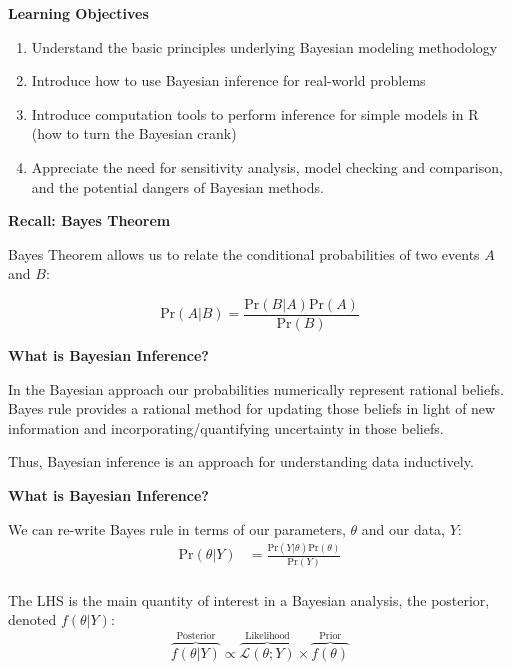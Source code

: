 \documentclass[12pt,xcolor=svgnames]{beamer}
\newcommand{\bl}{\color{blue}}
\newcommand{\theme}{\color{FireBrick}}
\newcommand{\sk}{\vspace{.4cm}}
\newcommand{\chap}[1]{{\theme \Large \bf #1} \sk}
\newcommand{\pr}{\text{Pr}}
\begin{document}


\begin{frame}
\chap{Learning Objectives}

\begin{enumerate}
\item Understand the basic principles underlying Bayesian modeling methodology
\item  Introduce how to use Bayesian inference for real-world problems
\item Introduce computation tools to perform inference for simple models in R (how to turn the Bayesian crank)
\item Appreciate the need for sensitivity analysis, model checking and comparison, and the potential dangers of Bayesian methods.
\end{enumerate}

\end{frame}


\begin{frame}
\chap{Recall: Bayes Theorem} 

Bayes Theorem allows us to relate the conditional probabilities of two events $A$ and $B$:

\begin{equation*}
\pr(A|B) = \frac{\pr(B|A)\pr(A)}{\pr(B)}
\end{equation*}

\end{frame}

\begin{frame}
\chap{What is Bayesian Inference?} 

In the Bayesian approach our probabilities numerically represent rational beliefs. Bayes rule provides a rational method for updating those beliefs in light of new information and incorporating/quantifying uncertainty in those beliefs.\\

\sk

Thus, Bayesian inference is an approach for understanding data inductively. 

\end{frame}

\begin{frame}
\chap{What is Bayesian Inference?} 

We can re-write Bayes rule in terms of our parameters, $\theta$ and our data, $Y$:
\begin{align*}
\text{Pr}(\theta|Y) & = \frac{\text{Pr}(Y|\theta)\text{Pr}(\theta)}{\text{Pr}(Y)}\\
\end{align*}

The LHS is the main quantity of interest in a Bayesian analysis, the {\bl posterior},  denoted $f(\theta|Y)$:
\begin{equation*}
\overbrace{f(\theta|Y)}^\text{Posterior} \propto \overbrace{\mathcal{L}(\theta; Y)}^\text{Likelihood} \times \overbrace{f(\theta)}^\text{Prior}
\end{equation*}


\end{frame}
\end{document}
